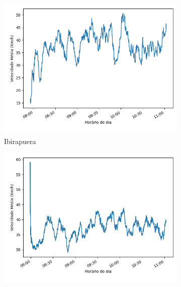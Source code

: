 \newpage


\begin{figure}[ht]
\centering
\begin{subfigure}{.45\textwidth}
  \centering
  \includegraphics[width=\textwidth]{figuras/detect_graphics/avg_speed_7-dez-su-corr_Ibirapuera.png}
  \caption{Ibirapuera}
  \label{fig::avg_speed_Ibirapuera}
\end{subfigure}%
\begin{subfigure}{.45\textwidth}
  \centering
  \includegraphics[width=\textwidth]{figuras/detect_graphics/avg_speed_7-dez-su-corr_Inajar.png}

\end{subfigure}
\end{figure}
